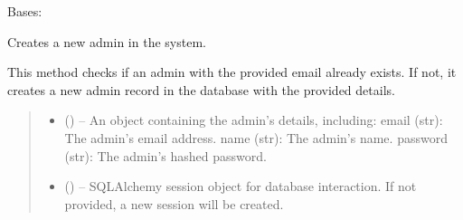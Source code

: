 \documentclass[letterpaper,10pt,english]{sphinxmanual}
\begin{document}
\begin{fulllineitems}
\label{\detokenize{app.controllers:app.controllers.admin_controller.AdminController}}
\pysigstartsignatures
\pysiglinewithargsret
{}
{}
{}
\pysigstopsignatures
\sphinxAtStartPar
Bases: 

\begin{fulllineitems}
\label{\detokenize{app.controllers:app.controllers.admin_controller.AdminController.create_admin}}
\pysigstartsignatures
\pysiglinewithargsret
{}
{\sphinxparamcomma {}}
{}
\pysigstopsignatures
\sphinxAtStartPar
Creates a new admin in the system.

\sphinxAtStartPar
This method checks if an admin with the provided email already exists.
If not, it creates a new admin record in the database with the provided details.
\begin{quote}\begin{description}
\begin{itemize}
\item {} 
\sphinxAtStartPar
{} () – An object containing the admin’s details, including:
\sphinxhyphen{} email (str): The admin’s email address.
\sphinxhyphen{} name (str): The admin’s name.
\sphinxhyphen{} password (str): The admin’s hashed password.

\item {} 
\sphinxAtStartPar
{} (\sphinxstyleliteralemphasis{\sphinxupquote{, }}) – SQLAlchemy session object for database interaction.
If not provided, a new session will be created.


\end{itemize}
\end{description}
\end{quote}
\end{fulllineitems}
\end{fulllineitems}
\end{document}
